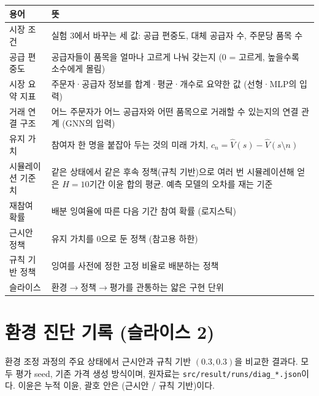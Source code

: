 \documentclass[11pt,a4paper]{article}
\begin{document}
\begin{tabularx}{\linewidth}{lY}
\toprule
용어 & 뜻\\
\midrule
시장 조건 & 실험 3에서 바꾸는 세 값: 공급 편중도, 대체 공급자 수, 주문당 품목 수\\
공급 편중도 & 공급자들이 품목을 얼마나 고르게 나눠 갖는지 (0 = 고르게, 높을수록 소수에게 몰림)\\
시장 요약 지표 & 주문자·공급자 정보를 합계·평균·개수로 요약한 값 (선형·MLP의 입력)\\
거래 연결 구조 & 어느 주문자가 어느 공급자와 어떤 품목으로 거래할 수 있는지의 연결 관계 (GNN의 입력)\\
유지 가치 & 참여자 한 명을 붙잡아 두는 것의 미래 가치, $c_n=\hat V(s)-\hat V(s\setminus n)$\\
시뮬레이션 기준치 & 같은 상태에서 같은 후속 정책(규칙 기반)으로 여러 번 시뮬레이션해 얻은 $H=10$기간 이윤 합의 평균. 예측 모델의 오차를 재는 기준\\
재참여 확률 & 배분 잉여율에 따른 다음 기간 참여 확률 (로지스틱)\\
근시안 정책 & 유지 가치를 0으로 둔 정책 (참고용 하한)\\
규칙 기반 정책 & 잉여를 사전에 정한 고정 비율로 배분하는 정책\\
슬라이스 & 환경$\to$정책$\to$평가를 관통하는 얇은 구현 단위\\
\bottomrule
\end{tabularx}

\section{환경 진단 기록 (슬라이스 2)}\label{sec:diag}

환경 조정 과정의 주요 상태에서 근시안과 규칙 기반 $(0.3,0.3)$을 비교한 결과다. 모두 평가 seed, 기존 가격 생성 방식이며,
원자료는 \texttt{src/result/runs/diag\_*.json}이다. 이윤은 누적 이윤, 괄호 안은 (근시안 / 규칙 기반)이다.
\end{document}
